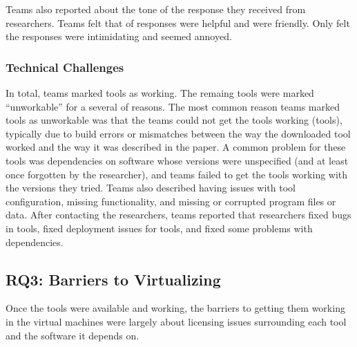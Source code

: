 \documentclass[10pt,conference]{IEEEtran}
\begin{document}


Teams also reported about the tone of the response they received from 
researchers.
Teams felt that \emailsHelpful of responses were helpful and
\emailsFriendly were friendly.
Only \emailsIntimidating felt the responses were intimidating
and \emailsAnnoyed seemed annoyed.                                                                                                              


\subsubsection{Technical Challenges}

In total, teams marked \working tools as working.
The remaing tools were marked ``unworkable'' for a 
several of reasons.
The most common reason teams marked tools as unworkable
was that the teams could not get the tools 
working (\unworkCouldntWorkIt tools),
typically due to build errors or mismatches between
the way the downloaded tool worked and the way 
it was described in the paper.
A common problem for these tools was dependencies on
software whose versions were unspecified 
(and at least once forgotten by the researcher), and teams
failed to get the tools working with the versions they
tried.
Teams also described having issues with 
tool configuration,
missing functionality, and
missing or corrupted program files or data.
After contacting the researchers, teams reported that researchers 
fixed bugs in \contactFixBug tools,
fixed deployment issues for \contactFixDepl tools,
and fixed some problems with dependencies.

\subsection{RQ3: Barriers to Virtualizing}

Once the tools were available and working, 
the barriers to getting them working in the
virtual machines were largely about licensing issues
surrounding each tool and the software it depends on.
\end{document}
